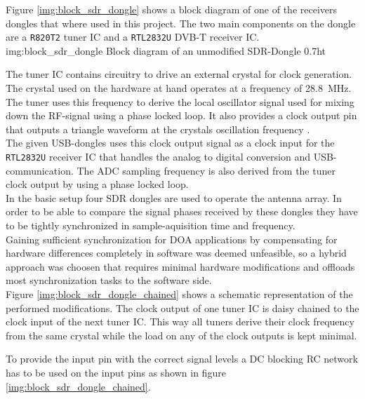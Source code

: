 Figure \ref{img:block_sdr_dongle} shows a block
diagram of one of the receivers dongles that where used
in this project.
The two main components on the dongle are a
\texttt{R820T2} tuner IC
and a \texttt{RTL2832U} DVB-T receiver IC. \\

             {img:block_sdr_dongle}
             {Block diagram of an unmodified SDR-Dongle}
             {0.7}{ht}

The tuner IC contains circuitry to drive an
external crystal for clock generation.
The crystal used on the hardware at hand
operates at a frequency of \SI{28.8}{\mega\hertz}.
The tuner uses this frequency to derive the
local oscillator signal used for mixing down
the RF-signal using a phase locked loop.
It also provides a clock output pin that
outputs a triangle waveform at the crystals
oscillation frequency \cite{r820t2datasheet}. \\

The given USB-dongles uses this clock output signal
as a clock input for the \texttt{RTL2832U}
receiver IC that handles the analog to digital
conversion and USB-communication.
The ADC sampling frequency is also derived from
the tuner clock output by using a phase locked loop. \\

In the basic setup four SDR dongles are used
to operate the antenna array.
In order to be able to compare the signal phases
received by these dongles they have to be tightly
synchronized in sample-aquisition time and frequency. \\

Gaining sufficient synchronization for DOA applications
by compensating for hardware differences completely
in software was deemed unfeasible, so a hybrid
approach was choosen that requires minimal hardware
modifications and offloads most synchronization tasks
to the software side. \\


Figure \ref{img:block_sdr_dongle_chained} shows
a schematic representation of the performed modifications.
The clock output of one tuner IC is daisy chained to
the clock input of the next tuner IC.
This way all tuners derive their clock frequency
from the same crystal while the load on any of
the clock outputs is kept minimal.

To provide the input pin with the correct signal
levels a DC blocking RC network has to be used
on the input pins as shown in
figure \ref{img:block_sdr_dongle_chained}.

